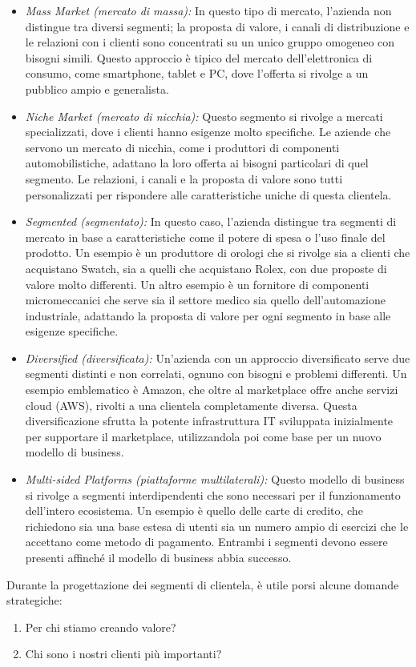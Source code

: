 \begin{itemize}
    \item \textit{Mass Market (mercato di massa):} In questo tipo di mercato, l’azienda non distingue tra diversi segmenti; la proposta di valore, i canali di distribuzione e le relazioni con i clienti sono concentrati su un unico gruppo omogeneo con bisogni simili. Questo approccio è tipico del mercato dell’elettronica di consumo, come smartphone, tablet e PC, dove l’offerta si rivolge a un pubblico ampio e generalista.
    \item \textit{Niche Market (mercato di nicchia):} Questo segmento si rivolge a mercati specializzati, dove i clienti hanno esigenze molto specifiche. Le aziende che servono un mercato di nicchia, come i produttori di componenti automobilistiche, adattano la loro offerta ai bisogni particolari di quel segmento. Le relazioni, i canali e la proposta di valore sono tutti personalizzati per rispondere alle caratteristiche uniche di questa clientela.
    \item \textit{Segmented (segmentato):} In questo caso, l'azienda distingue tra segmenti di mercato in base a caratteristiche come il potere di spesa o l’uso finale del prodotto. Un esempio è un produttore di orologi che si rivolge sia a clienti che acquistano Swatch, sia a quelli che acquistano Rolex, con due proposte di valore molto differenti. Un altro esempio è un fornitore di componenti micromeccanici che serve sia il settore medico sia quello dell’automazione industriale, adattando la proposta di valore per ogni segmento in base alle esigenze specifiche.
    \item \textit{Diversified (diversificata):} Un’azienda con un approccio diversificato serve due segmenti distinti e non correlati, ognuno con bisogni e problemi differenti. Un esempio emblematico è Amazon, che oltre al marketplace offre anche servizi cloud (AWS), rivolti a una clientela completamente diversa. Questa diversificazione sfrutta la potente infrastruttura IT sviluppata inizialmente per supportare il marketplace, utilizzandola poi come base per un nuovo modello di business.
    \item \textit{Multi-sided Platforms (piattaforme multilaterali):} Questo modello di business si rivolge a segmenti interdipendenti che sono necessari per il funzionamento dell’intero ecosistema. Un esempio è quello delle carte di credito, che richiedono sia una base estesa di utenti sia un numero ampio di esercizi che le accettano come metodo di pagamento. Entrambi i segmenti devono essere presenti affinché il modello di business abbia successo.
\end{itemize}
Durante la progettazione dei segmenti di clientela, è utile porsi alcune domande strategiche:
\begin{enumerate}
    \item Per chi stiamo creando valore?
    \item Chi sono i nostri clienti più importanti?
\end{enumerate}

